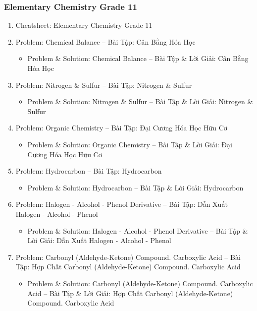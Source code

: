 \documentclass[12pt,oneside]{book}
\begin{document}
\subsubsection{Elementary Chemistry Grade 11}

\begin{enumerate}
	\item Cheatsheet: Elementary Chemistry Grade 11
	\item Problem: Chemical Balance -- Bài Tập: Cân Bằng Hóa Học
	\begin{itemize}
		\item Problem \& Solution: Chemical Balance -- Bài Tập \& Lời Giải: Cân Bằng Hóa Học
	\end{itemize}
	\item Problem: Nitrogen \& Sulfur -- Bài Tập: Nitrogen \& Sulfur
	\begin{itemize}
		\item Problem \& Solution: Nitrogen \& Sulfur -- Bài Tập \& Lời Giải: Nitrogen \& Sulfur
	\end{itemize}
	\item Problem: Organic Chemistry -- Bài Tập: Đại Cương Hóa Học Hữu Cơ
	\begin{itemize}
		\item Problem \& Solution: Organic Chemistry -- Bài Tập \& Lời Giải: Đại Cương Hóa Học Hữu Cơ
	\end{itemize}
	\item Problem: Hydrocarbon -- Bài Tập: Hydrocarbon
	\begin{itemize}
		\item Problem \& Solution: Hydrocarbon -- Bài Tập \& Lời Giải: Hydrocarbon
	\end{itemize}
	\item Problem: Halogen - Alcohol - Phenol Derivative -- Bài Tập: Dẫn Xuất Halogen - Alcohol - Phenol
	\begin{itemize}
		\item Problem \& Solution: Halogen - Alcohol - Phenol Derivative -- Bài Tập \& Lời Giải: Dẫn Xuất Halogen - Alcohol - Phenol
	\end{itemize}
	\item Problem: Carbonyl (Aldehyde-Ketone) Compound. Carboxylic Acid -- Bài Tập: Hợp Chất Carbonyl (Aldehyde-Ketone) Compound. Carboxylic Acid
	\begin{itemize}
		\item Problem \& Solution: Carbonyl (Aldehyde-Ketone) Compound. Carboxylic Acid -- Bài Tập \& Lời Giải: Hợp Chất Carbonyl (Aldehyde-Ketone) Compound. Carboxylic Acid
	\end{itemize}
\end{enumerate}
\end{document}
